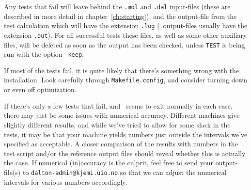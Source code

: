 Any tests that fail will leave behind the \verb|.mol| and \verb|.dal|
input-files (these are described in more detail in
chapter~\ref{ch:starting}), and the output-file from the test
calculation which will have the extension \verb|.log| (\dalton\
output-files usually have the extension \verb|.out|). For all
successful tests these files, as well as some other auxiliary files,
will be deleted as soon as the output has been checked, unless
\verb|TEST| is being run with the option \verb|-keep|.

If most of the tests fail, it is quite likely that there's something
wrong with the installation. Look carefully through
\verb|Makefile.config|, and consider turning down or even off
optimization.

If there's only a few tests that fail, and \dalton\ seems to exit
normally in each case, there may just be some issues with numerical
accuracy. Different machines give slightly different results, and
while we've tried to allow for some slack in the tests, it may be
that your machine yields numbers just outside the intervals we've
specified as acceptable. A closer comparison of the results with
numbers in the test script and/or the reference output files should
reveal whether this is actually the case. If numerical (in)accuracy is
the culprit, feel free to send your output-file(s) to
\verb|dalton-admin@kjemi.uio.no| so that we can adjust the numerical
intervals for various numbers accordingly.
